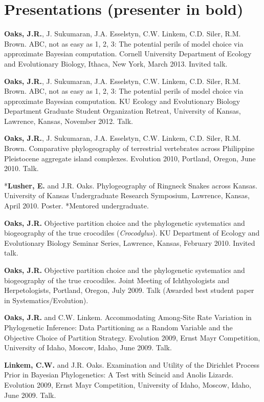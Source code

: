 \documentclass[10pt]{article}
\newcommand{\myHangIndent}{\hangindent=5mm}
\begin{document}
\section*{Presentations (presenter in bold)}
\myHangIndent
{\bf Oaks, J.R.}, J. Sukumaran, J.A. Esselstyn, C.W. Linkem, C.D. Siler, R.M.
Brown.
ABC, not as easy as 1, 2, 3: The potential perils of model choice via
approximate Bayesian computation.
Cornell University Department of Ecology and Evolutionary Biology, Ithaca,
New York, March 2013.
Invited talk.

\myHangIndent
{\bf Oaks, J.R.}, J. Sukumaran, J.A. Esselstyn, C.W. Linkem, C.D. Siler, R.M.
Brown.
ABC, not as easy as 1, 2, 3: The potential perils of model choice via
approximate Bayesian computation.
KU Ecology and Evolutionary Biology Department Graduate Student Organization
Retreat, University of Kansas, Lawrence, Kansas, November 2012.
Talk.

\myHangIndent
{\bf Oaks, J.R.}, J. Sukumaran, J.A. Esselstyn, C.W. Linkem, C.D. Siler, R.M.
Brown.
Comparative phylogeography of terrestrial vertebrates across Philippine
Pleistocene aggregate island complexes.
Evolution 2010, Portland, Oregon, June 2010.
Talk.

\myHangIndent
*{\bf Lusher, E.} and J.R. Oaks.
Phylogeography of Ringneck Snakes across Kansas.
University of Kansas Undergraduate Research Symposium, Lawrence, Kansas, April
2010.
Poster.
*Mentored undergraduate.

\myHangIndent
{\bf Oaks, J.R.}
Objective partition choice and the phylogenetic systematics and biogeography of
the true crocodiles (\emph{Crocodylus}).
KU Department of Ecology and Evolutionary Biology Seminar Series, Lawrence,
Kansas, February 2010.
Invited talk.

\myHangIndent
{\bf Oaks, J.R.}
Objective partition choice and the phylogenetic systematics and biogeography of
the true crocodiles.
Joint Meeting of Ichthyologists and Herpetologists, Portland, Oregon, July
2009.
Talk (Awarded best student paper in Systematics/Evolution).

\myHangIndent
{\bf Oaks, J.R.} and C.W. Linkem.
Accommodating Among-Site Rate Variation in Phylogenetic Inference: Data
Partitioning as a Random Variable and the Objective Choice of Partition
Strategy.
Evolution 2009, Ernst Mayr Competition, University of Idaho, Moscow, Idaho,
June 2009.
Talk.

\myHangIndent
{\bf Linkem, C.W.} and J.R. Oaks.
Examination and Utility of the Dirichlet Process Prior in Bayesian
Phylogenetics: A Test with Scincid and Anolis Lizards.
Evolution 2009, Ernst Mayr Competition, University of Idaho, Moscow, Idaho,
June 2009.
Talk.
\end{document}
